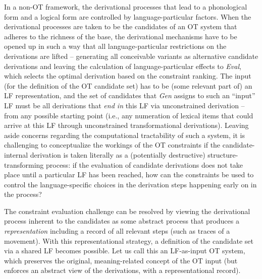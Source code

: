 \documentclass[output=paper,hidelinks]{langscibook}
\begin{document}
In a non-OT framework, the derivational processes that lead to a phonological form and a logical form are controlled by language-particular factors. When the derivational processes are taken to be the candidates of an OT system that adheres to the richness of the base, the derivational mechanisms have to be opened up in such a way that all language-particular restrictions on the derivations are lifted -- generating all conceivable variants as alternative candidate derivations and leaving the calculation of language-particular effects to \emph{Eval}, which selects the optimal derivation based on the constraint ranking. The input (for the definition of the OT candidate set) has to be (some relevant part of) an LF representation, and the set of candidates that \emph{Gen} assigns to such an ``input'' LF must be all derivations that \emph{end in} this LF via unconstrained derivation -- from any possible starting point (i.e., any numeration of lexical items that could arrive at this LF through unconstrained transformational derivations). Leaving aside concerns regarding the computational tractability of such a system, it is challenging to conceptualize the workings of the OT constraints if the candidate-internal derivation is taken literally as a (potentially destructive) structure-transforming process: if the evaluation of candidate derivations does not take place until a particular LF has been reached, how can the constraints be used to control the language-specific choices in the derivation steps happening early on in the process?  

The constraint evaluation challenge can be resolved by viewing the derivational process inherent to the candidates as some abstract process that produces a \emph{representation} including a record of all relevant steps (such as traces of a movement). With this representational strategy, a definition of the candidate set via a shared LF becomes possible. Let us call this an LF-as-input OT system, which preserves the original, meaning-related concept of the OT input (but enforces an abstract view of the derivations, with a representational record).
\end{document}

